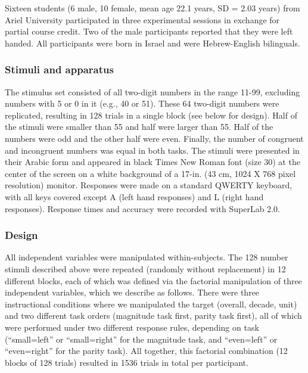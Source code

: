\documentclass[english,man]{apa6}
\theoremstyle{definition}
\theoremstyle{definition}
\theoremstyle{definition}
\theoremstyle{remark}
\begin{document}
Sixteen students (6 male, 10 female, mean age 22.1 years, SD = 2.03
years) from Ariel University participated in three experimental sessions
in exchange for partial course credit. Two of the male participants
reported that they were left handed. All participants were born in
Israel and were Hebrew-English bilinguals.

\subsubsection{Stimuli and apparatus}\label{stimuli-and-apparatus}

The stimulus set consisted of all two-digit numbers in the range 11-99,
excluding numbers with 5 or 0 in it (e.g., 40 or 51). These 64 two-digit
numbers were replicated, resulting in 128 trials in a single block (see
below for design). Half of the stimuli were smaller than 55 and half
were larger than 55. Half of the numbers were odd and the other half
were even. Finally, the number of congruent and incongruent numbers was
equal in both tasks. The stimuli were presented in their Arabic form and
appeared in black Times New Roman font (size 30) at the center of the
screen on a white background of a 17-in. (43 cm, 1024 X 768 pixel
resolution) monitor. Responses were made on a standard QWERTY keyboard,
with all keys covered except A (left hand responses) and L (right hand
responses). Response times and accuracy were recorded with SuperLab 2.0.

\subsubsection{Design}\label{design}

All independent variables were manipulated within-subjects. The 128
number stimuli described above were repeated (randomly without
replacement) in 12 different blocks, each of which was defined via the
factorial manipulation of three independent variables, which we describe
as follows. There were three instructional conditions where we
manipulated the target (overall, decade, unit) and two different task
orders (magnitude task first, parity task first), all of which were
performed under two different response rules, depending on task
(\enquote{small=left} or \enquote{small=right} for the magnitude task,
and \enquote{even=left} or \enquote{even=right} for the parity task).
All together, this factorial combination (12 blocks of 128 trials)
resulted in 1536 trials in total per participant.
\end{document}
